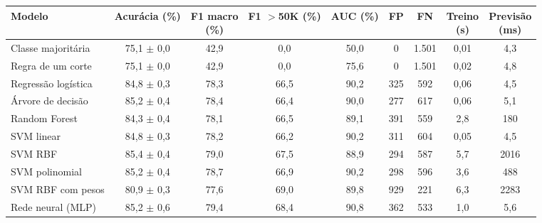 \setlength{\tabcolsep}{3.5pt}
\begin{tabular}{lcccccccc}
\toprule
Modelo & Acurácia (\%) & \shortstack{F1 macro\\(\%)} & \shortstack{F1 $>$50K\\(\%)} & AUC (\%) & FP & FN & \shortstack{Treino\\(s)} & \shortstack{Previsão\\(ms)} \\
\midrule
Classe majoritária & 75,1 $\pm$ 0,0 & 42,9 & 0,0 & 50,0 & 0 & 1.501 & 0,01 & 4,3 \\
Regra de um corte & 75,1 $\pm$ 0,0 & 42,9 & 0,0 & 75,6 & 0 & 1.501 & 0,02 & 4,8 \\
Regressão logística & 84,8 $\pm$ 0,3 & 78,3 & 66,5 & 90,2 & 325 & 592 & 0,06 & 4,5 \\
Árvore de decisão & 85,2 $\pm$ 0,4 & 78,4 & 66,4 & 90,0 & 277 & 617 & 0,06 & 5,1 \\
Random Forest & 84,3 $\pm$ 0,4 & 78,1 & 66,5 & 89,1 & 391 & 559 & 2,8 & 180 \\
\midrule
SVM linear & 84,8 $\pm$ 0,3 & 78,2 & 66,2 & 90,2 & 311 & 604 & 0,05 & 4,5 \\
SVM RBF & 85,4 $\pm$ 0,4 & 79,0 & 67,5 & 88,9 & 294 & 587 & 5,7 & 2016 \\
SVM polinomial & 85,2 $\pm$ 0,4 & 78,7 & 66,9 & 90,2 & 298 & 596 & 3,6 & 488 \\
SVM RBF com pesos & 80,9 $\pm$ 0,3 & 77,6 & 69,0 & 89,8 & 929 & 221 & 6,3 & 2283 \\
Rede neural (MLP) & 85,2 $\pm$ 0,6 & 79,4 & 68,4 & 90,8 & 362 & 533 & 1,0 & 5,6 \\
\bottomrule
\end{tabular}
